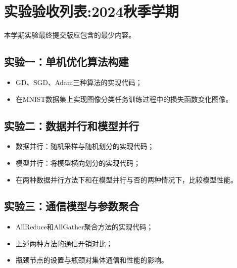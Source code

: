 \chapter{实验验收列表:2024秋季学期}

本学期实验最终提交版应包含的最少内容。

\section{实验一：单机优化算法构建}
\begin{itemize}
    \item GD、SGD、Adam三种算法的实现代码；
    \item 在MNIST数据集上实现图像分类任务训练过程中的损失函数变化图像。
\end{itemize}

\section{实验二：数据并行和模型并行}
\begin{itemize}
    \item 数据并行：随机采样与随机划分的实现代码；
    \item 模型并行：将模型横向划分的实现代码；
    \item 在两种数据并行方法下和在模型并行与否的两种情况下，比较模型性能。
\end{itemize}

\section{实验三：通信模型与参数聚合}
\begin{itemize}
    \item AllReduce和AllGather聚合方法的实现代码；
    \item 上述两种方法的通信开销对比；
    \item 瓶颈节点的设置与瓶颈对集体通信和性能的影响。
\end{itemize}